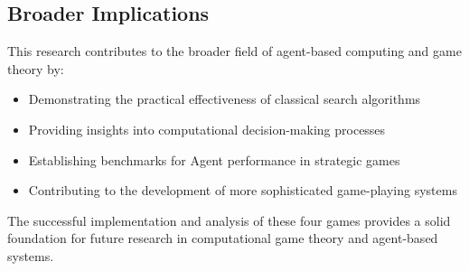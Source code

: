 \documentclass[12pt]{article}
\begin{document}
\subsection{Broader Implications}

This research contributes to the broader field of agent-based computing and game theory by:

\begin{itemize}
    \item Demonstrating the practical effectiveness of classical search algorithms
    \item Providing insights into computational decision-making processes
    \item Establishing benchmarks for Agent performance in strategic games
    \item Contributing to the development of more sophisticated game-playing systems
\end{itemize}

The successful implementation and analysis of these four games provides a solid foundation for future research in computational game theory and agent-based systems.
\end{document}
